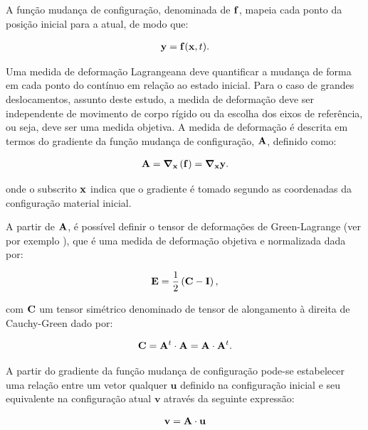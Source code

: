 A função mudança de configuração, denominada de $\mathbf{f}$, mapeia cada ponto da posição inicial para a atual, de modo que:

\begin{align}
	\mathbf{y} = \mathbf{f}(\mathbf{x},t).
\end{align}

Uma medida de deformação Lagrangeana deve quantificar a mudança de forma em cada ponto do contínuo em relação ao estado inicial. Para o caso de grandes deslocamentos, assunto deste estudo, a medida de deformação deve ser independente de movimento de corpo rígido ou da escolha dos eixos de referência, ou seja, deve ser uma medida objetiva. A medida de deformação é descrita em termos do gradiente da função mudança de configuração, $\mathbf{A}$, definido como:

\begin{align}
	\mathbf{A} = \boldsymbol{\nabla}_{\mathbf{x}}\left(\mathbf{f}\right) = \boldsymbol{\nabla}_{\mathbf{x}}\mathbf{y}.
\end{align}

\noindent onde o subscrito $\mathbf{x}$ indica que o gradiente é tomado segundo as coordenadas da configuração material inicial.

A partir de $\mathbf{A}$, é possível definir o tensor de deformações de Green-Lagrange (ver por exemplo ), que é uma medida de deformação objetiva e normalizada dada por: 

\begin{align}
	\mathbf{E} = \frac{1}{2}\left(\mathbf{C} - \mathbf{I}\right),
\end{align}

\noindent com $\mathbf{C}$ um tensor simétrico denominado de tensor de alongamento à direita de Cauchy-Green dado por:

\begin{align}
	\mathbf{C} = \mathbf{A}^{t} \cdot \mathbf{A} =  \mathbf{A} \cdot \mathbf{A}^{t}.
\end{align}

A partir do gradiente da função mudança de configuração pode-se estabelecer uma relação entre um vetor qualquer $\mathbf{u}$ definido na configuração inicial e seu equivalente na configuração atual $\mathbf{v}$ através da seguinte expressão:

\begin{align}
	\mathbf{v} = \mathbf{A} \cdot \mathbf{u} \label{eq:rel_vet}
\end{align}

